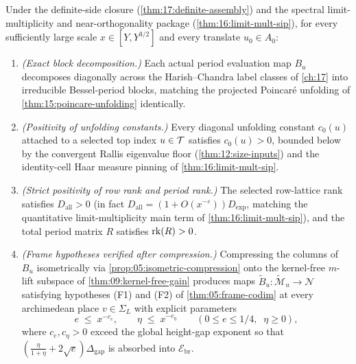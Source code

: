 \begin{theorem}
\label{thm:06:nonvanishing}
Under the definite-side closure (\cref{thm:17:definite-assembly}) and the spectral limit-multiplicity and near-orthogonality package (\cref{thm:16:limit-mult-sip}), for every sufficiently large scale $x \in [Y, Y^{3/2}]$ and every translate $u_0 \in A_0$:
\begin{enumerate}[label=\textup{(\roman*)}]
\item \emph{(Exact block decomposition.)} Each actual period evaluation map $B_u$ decomposes diagonally across the Harish--Chandra label classes of \cref{ch:17} into irreducible Bessel-period blocks, matching the projected Poincar\'e unfolding of \cref{thm:15:poincare-unfolding} identically.
\item \emph{(Positivity of unfolding constants.)} Every diagonal unfolding constant $c_0(u)$ attached to a selected top index $u \in \mathcal{T}$ satisfies $c_0(u) > 0$, bounded below by the convergent Rallis eigenvalue floor (\cref{thm:12:size-inputs}) and the identity-cell Haar measure pinning of \cref{thm:16:limit-mult-sip}.
\item \emph{(Strict positivity of row rank and period rank.)} The selected row-lattice rank satisfies $D_{\mathrm{all}} > 0$ (in fact $D_{\mathrm{all}} = (1 + O(x^{-\varepsilon})) D_{\mathrm{exp}}$, matching the quantitative limit-multiplicity main term of \cref{thm:16:limit-mult-sip}), and the total period matrix $R$ satisfies $\operatorname{rk}(R) > 0$.
\item \emph{(Frame hypotheses verified after compression.)} Compressing the columns of $B_u$ isometrically via \cref{prop:05:isometric-compression} onto the kernel-free $m$-lift subspace of \cref{thm:09:kernel-free-gain} produces maps $\widetilde{B}_u : \widetilde{\mathcal{M}}_u \to \mathcal{N}$ satisfying hypotheses \textup{(F1)} and \textup{(F2)} of \cref{thm:05:frame-codim} at every archimedean place $v \in \Sigma_L$ with explicit parameters
  \begin{equation}
  \label{eq:06:frame-params}
    e \;\le\; x^{-c_e}, \qquad \eta \;\le\; x^{-c_\eta} \qquad (0 \le e \le 1/4,\;\; \eta \ge 0),
  \end{equation}
  where $c_e, c_\eta > 0$ exceed the global height-gap exponent so that $(\frac{\eta}{1+\eta} + 2\sqrt{e})\Delta_{\mathrm{gap}}$ is absorbed into $\mathcal{E}_{\mathrm{br}}$.
\end{enumerate}
\end{theorem}

